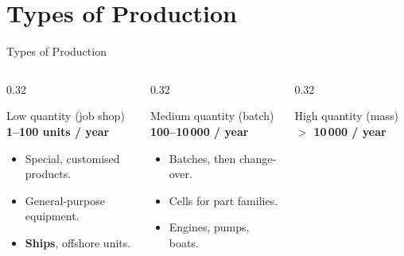 \documentclass[aspectratio=169]{beamer}
\begin{document}
	\section{Types of Production}
	\begin{frame}{Types of Production}
		\begin{columns}[T]
			\begin{column}{0.32\textwidth}
				\begin{block}{Low quantity (job shop)}
					\centering
					\textbf{1--100 units / year}

					\vspace{0.2cm}

					\begin{itemize}\small
						\item Special, customised products.
						\item General-purpose equipment.
						\item \textbf{Ships}, offshore units.
					\end{itemize}
				\end{block}
			\end{column}
			\begin{column}{0.32\textwidth}
				\begin{block}{Medium quantity (batch)}
					\centering
					\textbf{100--10\,000 / year}

					\vspace{0.2cm}

					\begin{itemize}\small
						\item Batches, then change-over.
						\item Cells for part families.
						\item Engines, pumps, boats.
					\end{itemize}
				\end{block}
			\end{column}
			\begin{column}{0.32\textwidth}
				\begin{block}{High quantity (mass)}
					\centering
					\textbf{$>$ 10\,000 / year}

					\vspace{0.2cm}


\end{block}
\end{column}
\end{columns}
\end{frame}
\end{document}

